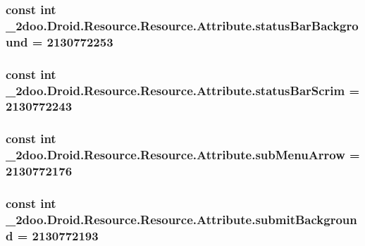 \hypertarget{class__2doo_1_1_droid_1_1_resource_1_1_attribute_a3faa76cf1df2319dca665758031f3d0}{
\subsubsection[{statusBarBackground}]{\setlength{\rightskip}{0pt plus 5cm}const int \_\-2doo.Droid.Resource.Resource.Attribute.statusBarBackground = 2130772253}}
\label{class__2doo_1_1_droid_1_1_resource_1_1_attribute_a3faa76cf1df2319dca665758031f3d0}


\hypertarget{class__2doo_1_1_droid_1_1_resource_1_1_attribute_3077f094a7dd990f14c3aa0951e51731}{
\subsubsection[{statusBarScrim}]{\setlength{\rightskip}{0pt plus 5cm}const int \_\-2doo.Droid.Resource.Resource.Attribute.statusBarScrim = 2130772243}}
\label{class__2doo_1_1_droid_1_1_resource_1_1_attribute_3077f094a7dd990f14c3aa0951e51731}


\hypertarget{class__2doo_1_1_droid_1_1_resource_1_1_attribute_d3e227ba01b0f2deee3a940ab51f91c5}{
\subsubsection[{subMenuArrow}]{\setlength{\rightskip}{0pt plus 5cm}const int \_\-2doo.Droid.Resource.Resource.Attribute.subMenuArrow = 2130772176}}
\label{class__2doo_1_1_droid_1_1_resource_1_1_attribute_d3e227ba01b0f2deee3a940ab51f91c5}


\hypertarget{class__2doo_1_1_droid_1_1_resource_1_1_attribute_f072450a6ffc7271e7f63196d28c586a}{
\subsubsection[{submitBackground}]{\setlength{\rightskip}{0pt plus 5cm}const int \_\-2doo.Droid.Resource.Resource.Attribute.submitBackground = 2130772193}}
\label{class__2doo_1_1_droid_1_1_resource_1_1_attribute_f072450a6ffc7271e7f63196d28c586a}


